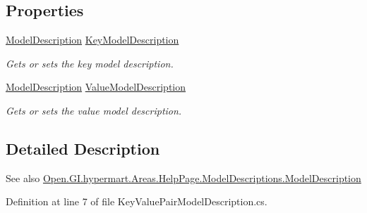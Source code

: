 \subsection*{Properties}
\begin{DoxyCompactItemize}
\item 
\hyperlink{class_open_1_1_g_i_1_1hypermart_1_1_areas_1_1_help_page_1_1_model_descriptions_1_1_model_description}{Model\+Description} \hyperlink{class_open_1_1_g_i_1_1hypermart_1_1_areas_1_1_help_page_1_1_model_descriptions_1_1_key_value_pair_model_description_a76ccd9d3ad532ce5a56b52d15d84c324}{Key\+Model\+Description}
\begin{DoxyCompactList}\small\item\em Gets or sets the key model description. \end{DoxyCompactList}\item 
\hyperlink{class_open_1_1_g_i_1_1hypermart_1_1_areas_1_1_help_page_1_1_model_descriptions_1_1_model_description}{Model\+Description} \hyperlink{class_open_1_1_g_i_1_1hypermart_1_1_areas_1_1_help_page_1_1_model_descriptions_1_1_key_value_pair_model_description_a5bcf18b1e78df6ba8b0cbc001a11ace6}{Value\+Model\+Description}
\begin{DoxyCompactList}\small\item\em Gets or sets the value model description. \end{DoxyCompactList}\end{DoxyCompactItemize}


\subsection{Detailed Description}


\begin{DoxySeeAlso}{See also}
\hyperlink{class_open_1_1_g_i_1_1hypermart_1_1_areas_1_1_help_page_1_1_model_descriptions_1_1_model_description}{Open.\+G\+I.\+hypermart.\+Areas.\+Help\+Page.\+Model\+Descriptions.\+Model\+Description}


\end{DoxySeeAlso}


Definition at line 7 of file Key\+Value\+Pair\+Model\+Description.\+cs.



